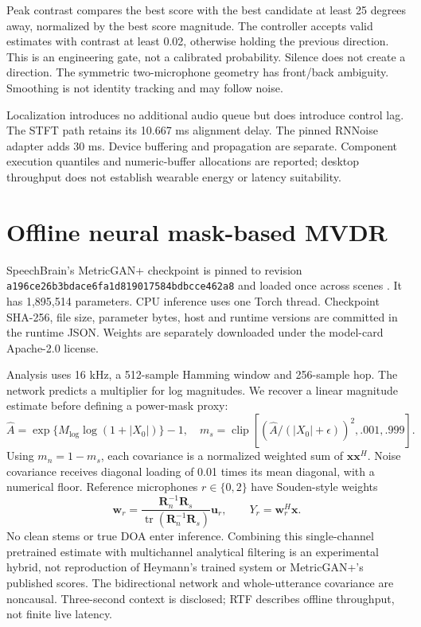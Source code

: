 \documentclass[10pt,a4paper]{article}
\begin{document}
Peak contrast compares the best score with the best candidate at least 25 degrees away, normalized by the best score magnitude. The controller accepts valid estimates with contrast at least 0.02, otherwise holding the previous direction. This is an engineering gate, not a calibrated probability. Silence does not create a direction. The symmetric two-microphone geometry has front/back ambiguity. Smoothing is not identity tracking and may follow noise.

Localization introduces no additional audio queue but does introduce control lag. The STFT path retains its 10.667 ms alignment delay. The pinned RNNoise adapter adds 30 ms. Device buffering and propagation are separate. Component execution quantiles and numeric-buffer allocations are reported; desktop throughput does not establish wearable energy or latency suitability.

\section{Offline neural mask-based MVDR}
SpeechBrain's MetricGAN+ checkpoint is pinned to revision \texttt{a196ce26b3bdace6fa1d819017584bdbcce462a8} and loaded once across scenes \cite{metricgan,model}. It has 1,895,514 parameters. CPU inference uses one Torch thread. Checkpoint SHA-256, file size, parameter bytes, host and runtime versions are committed in the runtime JSON. Weights are separately downloaded under the model-card Apache-2.0 license.

Analysis uses 16 kHz, a 512-sample Hamming window and 256-sample hop. The network predicts a multiplier for log magnitudes. We recover a linear magnitude estimate before defining a power-mask proxy:
\[
 \widehat A=\exp\{M_{\log}\log(1+|X_0|)\}-1,\quad
 m_s=\operatorname{clip}\left[(\widehat A/(|X_0|+\epsilon))^2,.001,.999\right].
\]
Using $m_n=1-m_s$, each covariance is a normalized weighted sum of $\mathbf x\mathbf x^H$. Noise covariance receives diagonal loading of 0.01 times its mean diagonal, with a numerical floor. Reference microphones $r\in\{0,2\}$ have Souden-style weights
\[
 \mathbf w_r=\frac{\mathbf R_n^{-1}\mathbf R_s}{\operatorname{tr}(\mathbf R_n^{-1}\mathbf R_s)}\mathbf u_r,
 \qquad Y_r=\mathbf w_r^H\mathbf x.
\]
No clean stems or true DOA enter inference. Combining this single-channel pretrained estimate with multichannel analytical filtering is an experimental hybrid, not reproduction of Heymann's trained system or MetricGAN+'s published scores. The bidirectional network and whole-utterance covariance are noncausal. Three-second context is disclosed; RTF describes offline throughput, not finite live latency.
\end{document}
